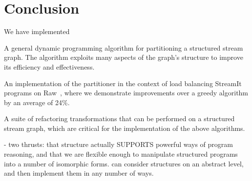 \section{Conclusion}

We have implemented 

\item A general dynamic programming algorithm for partitioning a
structured stream graph.  The algorithm exploits many aspects of the
graph's structure to improve its efficiency and effectiveness.

\item An implementation of the partitioner in the context of load
balancing StreamIt programs on Raw~\cite{raw-micro}, where we
demonstrate improvements over a greedy algorithm by an average of
24\%.

\item A suite of refactoring transformations that can be performed on
a structured stream graph, which are critical for the implementation
of the above algorithms.

- two thrusts: that structure actually SUPPORTS powerful ways of
program reasoning, and that we are flexible enough to manipulate
structured programs into a number of isomorphic forms.  can consider
structures on an abstract level, and then implement them in any number
of ways.


